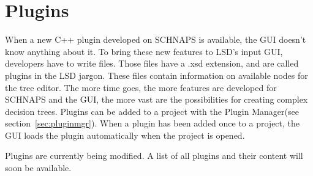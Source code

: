\documentclass[a4paper,11pt]{report}
\begin{document}
\chapter{Plugins}
\label{sec:plugins}
When a new C++ plugin developed on SCHNAPS is available, the GUI doesn't know anything about it. To bring these new features to LSD's input GUI, developers have to write files. Those files have a .xsd extension, and are called plugins in the LSD jargon. These files contain information on available nodes for the tree editor. The more time goes, the more features are developed for SCHNAPS and the GUI, the more vast are the possibilities for creating complex decision trees. Plugins can be added to a project with the Plugin Manager(see section~\ref{sec:pluginmgr}). When a plugin has been added once to a project, the GUI loads the plugin automatically when the project is opened.

Plugins are currently being modified. A list of all plugins and their content will soon be available.
\end{document}
